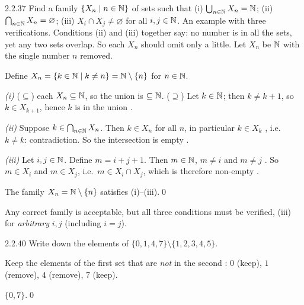 \begin{bookex}[essential]{2.2.37}
Find a family $\{X_n\mid n\in\mathbb{N}\}$ of sets such that (i) $\bigcup_{n\in\mathbb{N}}X_n=\mathbb{N}$; (ii) $\bigcap_{n\in\mathbb{N}}X_n=\varnothing$; (iii) $X_i\cap X_j\ne\varnothing$ for all $i,j\in\mathbb{N}$.
\solution
\goal An example with three verifications. Conditions (ii) and (iii) together say: no number is in all the sets, yet any two sets overlap. So each $X_n$ should omit only a little.
\plan Let $X_n$ be $\mathbb{N}$ with the single number $n$ removed.
\begin{steps}
\item Define $X_n=\{k\in\mathbb{N}\mid k\ne n\}=\mathbb{N}\setminus\{n\}$ for $n\in\mathbb{N}$.
\item \emph{(i)} ($\subseteq$) each $X_n\subseteq\mathbb{N}$, so the union is $\subseteq\mathbb{N}$. ($\supseteq$) Let $k\in\mathbb{N}$; then $k\ne k+1$, so $k\in X_{k+1}$, hence $k$ is in the union .
\item \emph{(ii)} Suppose $k\in\bigcap_{n\in\mathbb{N}}X_n$. Then $k\in X_n$ for all $n$, in particular $k\in X_k$ , i.e.\ $k\ne k$: contradiction. So the intersection is empty .
\item \emph{(iii)} Let $i,j\in\mathbb{N}$. Define $m=i+j+1$. Then $m\in\mathbb{N}$, $m\ne i$  and $m\ne j$ . So $m\in X_i$ and $m\in X_j$, i.e.\ $m\in X_i\cap X_j$, which is therefore non-empty .
\end{steps}
\conclusion The family $X_n=\mathbb{N}\setminus\{n\}$ satisfies (i)--(iii).\qed
\begin{compare}
\item Any correct family is acceptable, but all three conditions must be verified, (iii) for \emph{arbitrary} $i,j$ (including $i=j$).
\end{compare}
\end{bookex}

\begin{bookex}[essential]{2.2.40}
Write down the elements of $\{0,1,4,7\}\setminus\{1,2,3,4,5\}$.
\solution
\begin{steps}
\item Keep the elements of the first set that are \emph{not} in the second : $0$ (keep), $1$ (remove), $4$ (remove), $7$ (keep).
\end{steps}
\answer $\{0,7\}$.\qed
\end{bookex}

